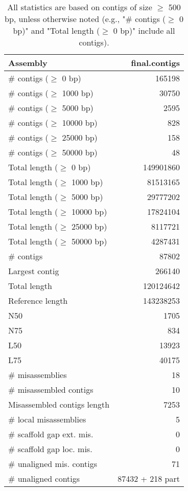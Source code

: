 \documentclass[12pt,a4paper]{article}
\begin{document}
\begin{table}[ht]
\begin{center}
\caption{All statistics are based on contigs of size $\geq$ 500 bp, unless otherwise noted (e.g., "\# contigs ($\geq$ 0 bp)" and "Total length ($\geq$ 0 bp)" include all contigs).}
\begin{tabular}{|l*{1}{|r}|}
\hline
Assembly & final.contigs \\ \hline
\# contigs ($\geq$ 0 bp) & 165198 \\ \hline
\# contigs ($\geq$ 1000 bp) & 30750 \\ \hline
\# contigs ($\geq$ 5000 bp) & 2595 \\ \hline
\# contigs ($\geq$ 10000 bp) & 828 \\ \hline
\# contigs ($\geq$ 25000 bp) & 158 \\ \hline
\# contigs ($\geq$ 50000 bp) & 48 \\ \hline
Total length ($\geq$ 0 bp) & 149901860 \\ \hline
Total length ($\geq$ 1000 bp) & 81513165 \\ \hline
Total length ($\geq$ 5000 bp) & 29777202 \\ \hline
Total length ($\geq$ 10000 bp) & 17824104 \\ \hline
Total length ($\geq$ 25000 bp) & 8117721 \\ \hline
Total length ($\geq$ 50000 bp) & 4287431 \\ \hline
\# contigs & 87802 \\ \hline
Largest contig & 266140 \\ \hline
Total length & 120124642 \\ \hline
Reference length & 143238253 \\ \hline
N50 & 1705 \\ \hline
N75 & 834 \\ \hline
L50 & 13923 \\ \hline
L75 & 40175 \\ \hline
\# misassemblies & 18 \\ \hline
\# misassembled contigs & 10 \\ \hline
Misassembled contigs length & 7253 \\ \hline
\# local misassemblies & 5 \\ \hline
\# scaffold gap ext. mis. & 0 \\ \hline
\# scaffold gap loc. mis. & 0 \\ \hline
\# unaligned mis. contigs & 71 \\ \hline
\# unaligned contigs & 87432 + 218 part \\ \hline

\end{tabular}
\end{center}
\end{table}
\end{document}
